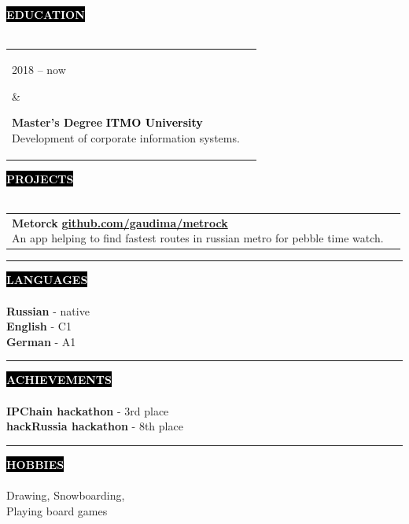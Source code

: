 \documentclass[10pt,A4]{article}
\makeatletter
\newcounter{a}
\newcounter{b}
\newcounter{c}
\newcommand{\cvsection}[1] {
\textcolor{white}{\MakeUppercase{\textbf{#1}}}
}
\newcommand{\cvsect}[1]{
\colorbox{black}{{\cvsection{#1}}}\\\\%
}
\newenvironment{entrylist}{%
\begin{tabular*}{\textwidth}[t]{@{\extracolsep{\fill}}ll}
}{%
\end{tabular*}
}
\newcommand{\entry}[4]{%
\parbox[t]{3.5cm}{%
#1%
}%
&\parbox[t]{14cm}{%
\textbf{#2}%
\hfill%
{\footnotesize \textbf{\textcolor{black}{#3}}}\\%
#4%
}\\\\}
\newcommand{\entryy}[3]{%
\parbox[t]{17.5cm}{%
\textbf{#1}%
\hfill%
{\footnotesize \textbf{\textcolor{black}{#2}}}\\%
#3%
}\\\\}
\makeatother
\begin{document}
\vspace{5mm}
\cvsect{Education}
\begin{entrylist}
\entry
{2018 – now}
{Master's Degree}
{ITMO University}
{Development of corporate information systems.}
\entry
{2014 – 2018}
{Bachelor's Degree}
{ITMO University}
{Applied mathematics and computer science.}
\end{entrylist}

\vspace{5mm}
\cvsect{Projects}
\begin{entrylist}
\entryy
{Metorck}
{\href{https://github.com/gaudima/metrock}{github.com/gaudima/metrock}}
{An app helping to find fastest routes in russian metro for pebble time watch.}
\entryy
{C-Boy}
{\href{https://github.com/gaudima/c-boy}{github.com/gaudima/c-boy}}
{Classic gameboy emulator written as a project for C++ course.}
\end{entrylist}

\vspace{5mm}
\begin{minipage}[t]{0.3\textwidth}\hrule height 0pt width 0pt%
\cvsect{Languages}
\textbf{Russian} - native\\
\textbf{English} - C1\\
\textbf{German} - A1
\end{minipage}%
\begin{minipage}[t]{0.4\textwidth}\hrule height 0pt width 0pt%
\cvsect{Achievements}
\textbf{IPChain hackathon} - 3rd place\\
\textbf{hackRussia hackathon} - 8th place
\end{minipage}%
\begin{minipage}[t]{0.3\textwidth}\hrule height 0pt width 0pt%
\cvsect{Hobbies}
Drawing, Snowboarding,\\Playing board games
\end{minipage}%
\end{document}
